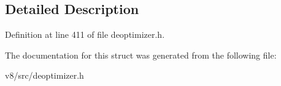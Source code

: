 \subsection{Detailed Description}


Definition at line 411 of file deoptimizer.\+h.



The documentation for this struct was generated from the following file\+:\begin{DoxyCompactItemize}
\item 
v8/src/deoptimizer.\+h\end{DoxyCompactItemize}

